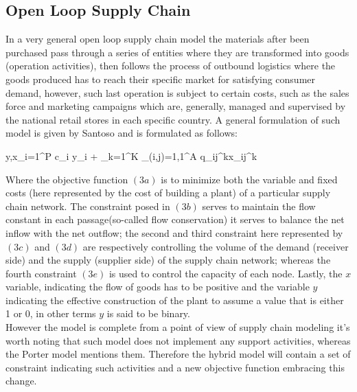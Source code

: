 \begin{doublespace}
\subsection{Open Loop Supply Chain}
In a very general open loop supply chain model the materials after been purchased pass through a series of entities where they are transformed into goods (operation activities), then follows the process of outbound logistics where the goods produced has to reach their specific market for satisfying consumer demand, however, such last operation is subject to certain costs, such as the sales force and marketing campaigns which are, generally, managed and supervised by the national retail stores in each specific country.
A general formulation of such model is given by Santoso and is formulated as follows:
\begin{mini!}
	{y,x}{\sum_{i=1}^{P} c_i y_i  + \sum_{k=1}^{K} \sum_{(i,j)=1,1}^{A} q_{ij}^{k}x_{ij}^{k}}{}{}
\end{mini!}

Where the objective function $(3a)$ is to minimize both the variable and fixed costs (here represented by the cost of building a plant) of a particular supply chain network.
The constraint posed in $(3b)$ serves to maintain the flow constant in each passage(so-called flow conservation) it serves to balance the net inflow with the net outflow; the second and third constraint here represented by $(3c)$ and $(3d)$ are respectively controlling the volume of the demand (receiver side) and the supply (supplier side) of the supply chain network; whereas the fourth constraint $(3e)$ is used to control the capacity of each node. Lastly, the $x$ variable, indicating the flow of goods has to be positive and the variable $y$ indicating the effective construction of the plant to assume a value that is either 1 or 0, in other terms $y$ is said to be binary. 
\\
However the model is complete from a point of view of supply chain modeling it's worth noting that such model does not implement any support activities, whereas the Porter model mentions them. Therefore the hybrid model will contain a set of constraint indicating such activities and a new objective function embracing this change.


\end{doublespace}
